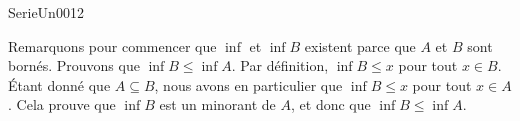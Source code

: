 

\begin{corrige}{SerieUn0012}

	Remarquons pour commencer que $\inf $ et $\inf B$ existent parce que $A$ et $B$ sont bornés. Prouvons que $\inf B\leq\inf A$. Par définition, $\inf B\leq x$ pour tout $x\in B$. Étant donné que $A\subseteq B$, nous avons en particulier que $\inf B\leq x$ pour tout $x\in A$. Cela prouve que $\inf B$ est un minorant de $A$, et donc que $\inf B\leq \inf A$.

\end{corrige}
